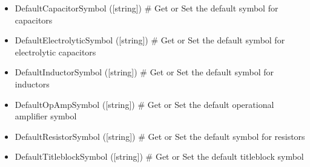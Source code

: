  \begin{itemize}
\item DefaultCapacitorSymbol ([string]) \# Get or Set the default symbol for capacitors
\item DefaultElectrolyticSymbol ([string]) \# Get or Set the default symbol for electrolytic capacitors
\item DefaultInductorSymbol ([string]) \# Get or Set the default symbol for inductors
\item DefaultOpAmpSymbol ([string]) \# Get or Set the default operational amplifier symbol
\item DefaultResistorSymbol ([string]) \# Get or Set the default symbol for resistors
\item DefaultTitleblockSymbol ([string]) \# Get or Set the default titleblock symbol

\end{itemize}

